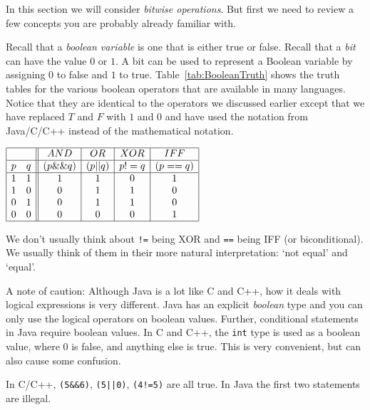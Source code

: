 In this section we will consider {\em bitwise operations}.  But first we need to review a few
concepts you are probably already familiar with.

Recall that a {\em boolean variable} is one that is either
true or false. 
Recall that a {\em bit} can have the value $0$ or $1$.  A bit can be used to represent a
Boolean variable by assigning $0$ to false and $1$ to true.
Table~\ref{tab:BooleanTruth} shows the truth tables for the various boolean operators 
that are available in many languages.
Notice that they are identical to the operators we discussed earlier except that we have 
replaced $T$ and $F$ with $1$ and $0$ and have used the notation from Java/C/C++ instead of the mathematical
notation.

\begin{table}[h]
\centering
$
\begin{array}{|cc||c|c|c|c|}
\hline  &  & AND & OR & XOR & IFF \\
\hline p & q & (p \&\& q) & (p || q) &p != q& (p  == q) \\
\hline 
1 & 1& 1 &1&0&1 \\
1 & 0& 0 &1&1&0 \\
0 & 1& 0 &1&1&0 \\
0 & 0& 0 &0&0&1 \\
\hline
\end{array}
$
\footnotesize\caption{Truth Tables for the Boolean Operators}\label{tab:BooleanTruth}
\end{table}

We don't usually think about \verb+!=+ being XOR 
and \verb+==+ being IFF (or biconditional).  We usually think of them in their more natural
interpretation: `not equal' and `equal'.  

\begin{rem}
A note of caution: Although Java is a lot like C and C++, how it deals with logical expressions
is very different.  Java has an explicit {\em boolean} type and you can only use the logical operators
on boolean values.  Further, conditional statements in Java require boolean values.   
In C and C++, the \verb+int+ type is used as a boolean value, where $0$ is false, and anything else is true.
This is very convenient, but can also cause some confusion.
\end{rem}

\begin{exa}
In C/C++, \verb+(5&&6)+, \verb+(5||0)+, \verb+(4!=5)+ are all true.  In Java the first two statements
are illegal. 
\end{exa}

